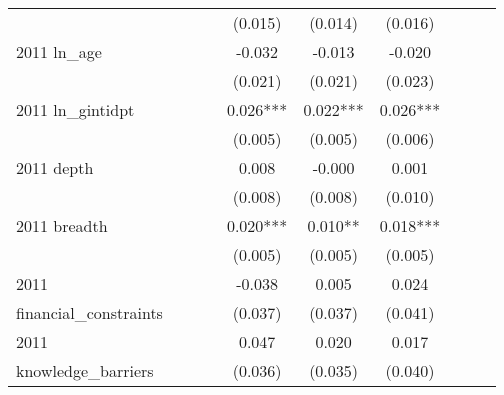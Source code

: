 \begin{table}[htbp]
\begin{tabular}{l*{9}{c}}
                    &               &               &               &     (0.015)   &     (0.014)   &     (0.016)   &               &               &               \\
2011 ln\_age         &               &               &               &      -0.032   &      -0.013   &      -0.020   &               &               &               \\
                    &               &               &               &     (0.021)   &     (0.021)   &     (0.023)   &               &               &               \\
2011 ln\_gintidpt    &               &               &               &       0.026***&       0.022***&       0.026***&               &               &               \\
                    &               &               &               &     (0.005)   &     (0.005)   &     (0.006)   &               &               &               \\
2011 depth          &               &               &               &       0.008   &      -0.000   &       0.001   &               &               &               \\
                    &               &               &               &     (0.008)   &     (0.008)   &     (0.010)   &               &               &               \\
2011 breadth        &               &               &               &       0.020***&       0.010** &       0.018***&               &               &               \\
                    &               &               &               &     (0.005)   &     (0.005)   &     (0.005)   &               &               &               \\
2011                &               &               &               &      -0.038   &       0.005   &       0.024   &               &               &               \\
financial\_constraints&               &               &               &     (0.037)   &     (0.037)   &     (0.041)   &               &               &               \\
2011                &               &               &               &       0.047   &       0.020   &       0.017   &               &               &               \\
knowledge\_barriers  &               &               &               &     (0.036)   &     (0.035)   &     (0.040)   &               &               &               \\

\end{tabular}
\end{table}
